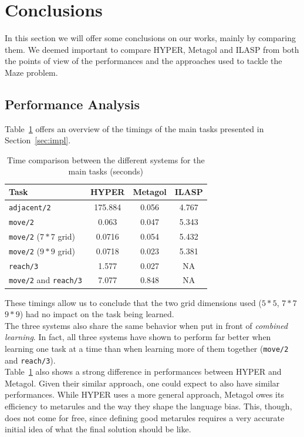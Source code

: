 \section{Conclusions}\label{sec:perf}
In this section we will offer some conclusions on our works, mainly by comparing them. We deemed important
to compare HYPER, Metagol and ILASP from both the points of view of the performances and the approaches used
to tackle the Maze problem.

\subsection{Performance Analysis}
Table~\ref{tab:prf_cmp} offers an overview of the timings of the main tasks presented in Section~\ref{sec:impl}.
{
\begin{center}
    \begin{table}[h]
    \centering
    \begin{tabular}{ |l|c|c|c| } 
        \hline
        Task & \textbf{HYPER} & \textbf{Metagol} & \textbf{ILASP} \\ \hline
        \texttt{adjacent/2} & 175.884 & 0.056 & 4.767 \\ 
        \texttt{move/2} & 0.063 & 0.047 & 5.343 \\ 
        \texttt{move/2} (\(7*7\) grid) & 0.0716 & 0.054 & 5.432 \\
        \texttt{move/2} (\(9*9\) grid) & 0.0718 & 0.023 & 5.381 \\
        \texttt{reach/3} & 1.577 & 0.027 & NA \\ 
        \texttt{move/2} and \texttt{reach/3} & 7.077 & 0.848 & NA \\ 
        \hline
    \end{tabular}
    \caption{\label{tab:prf_cmp}Time comparison between the different systems for the main tasks (seconds)}
\end{table}
\end{center}
}
These timings allow us to conclude that the two grid dimensions used (\(5*5\), \(7*7\) \(9*9\)) had no impact on the task being learned.\\
The three systems also share the same behavior when put in front of \emph{combined learning}. In fact, all three systems have shown to perform 
far better when learning one task at a time than when learning more of them together (\texttt{move/2} and \texttt{reach/3}).\\
Table~\ref{tab:prf_cmp} also shows a strong difference in performances between HYPER and Metagol. Given their similar approach, one could expect
to also have similar performances. While HYPER uses a more general approach, Metagol owes its efficiency to metarules and the way they shape the language bias. This, though, does not come
for free, since defining good metarules requires a very accurate initial idea of what the final solution should be like.\\

